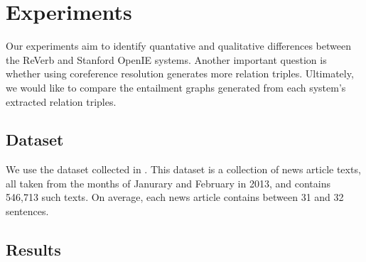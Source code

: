 \section{Experiments}

Our experiments aim to identify quantative and qualitative differences
between the ReVerb and Stanford OpenIE systems. Another important question
is whether using coreference resolution generates more relation triples. 
Ultimately, we would like to compare the entailment graphs generated from
each system's extracted relation triples. 

\subsection{Dataset}
We use the \newsspike{} dataset collected in \citet{zhang2013parallelparaphrase}.
This dataset is a collection of news article texts, all taken from the months of
Janurary and February in 2013, and contains 546,713 such texts. On average,
each news article contains between 31 and 32 sentences.

\subsection{Results}
 



